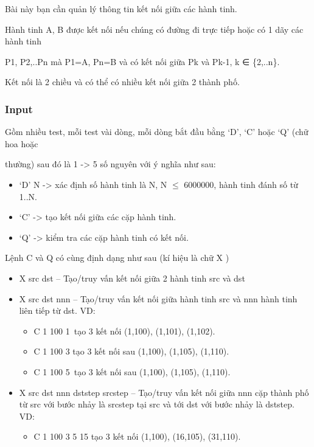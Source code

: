 

Bài này bạn cần quản lý thông tin kết nối giữa các hành tinh.

Hành tinh A, B được kết nối nếu chúng có đường đi trực tiếp hoặc có 1 dãy các hành tinh

P1, P2,..Pn mà P1=A, Pn=B và có kết nối giữa Pk và Pk-1, k ∈ \{2,..n\}.

Kết nối là 2 chiều và có thể có nhiều kết nối giữa 2 thành phố.

\subsubsection{Input}

Gồm nhiều test, mỗi test vài dòng, mỗi dòng bắt đầu bằng ‘D’, ‘C’ hoặc ‘Q’ (chữ hoa hoặc

thường) sau đó là 1 -> 5 số nguyên với ý nghĩa như sau:
\begin{itemize}
	\item ‘D’ N -> xác định số hành tinh là N, N $\le$ 6000000, hành tinh đánh số từ 1..N.
	\item ‘C’ -> tạo kết nối giữa các cặp hành tinh.
	\item ‘Q’ -> kiểm tra các cặp hành tinh có kết nối.
\end{itemize}

Lệnh C và Q có cùng định dạng như sau (kí hiệu là chữ X )
\begin{itemize}
	\item X src dst – Tạo/truy vấn kết nối giữa 2 hành tinh src và dst
	\item X src dst nnn – Tạo/truy vấn kết nối giữa hành tinh src và nnn hành tinh liên tiếp từ dst. VD:
\begin{itemize}
	\item C 1 100 1 tạo 3 kết nối (1,100), (1,101), (1,102).
	\item C 1 100 3 tạo 3 kết nối sau (1,100), (1,105), (1,110).
	\item C 1 100 5 tạo 3 kết nối sau (1,100), (1,105), (1,110).
\end{itemize}
	\item X src dst nnn dststep srcstep – Tạo/truy vấn kết nối giữa nnn cặp thành phố từ src với bước nhảy là srcstep tại src và tới dst với bước nhảy là dststep. VD:
\begin{itemize}
	\item C 1 100 3 5 15 tạo 3 kết nối (1,100), (16,105), (31,110).
\end{itemize}
\end{itemize}

